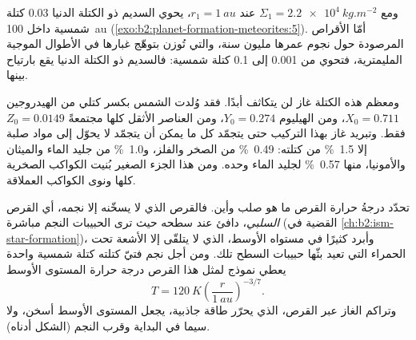 ومع $\Sigma_1 = \qty{2.2e4}{kg.m^{-2}}$ عند $r_1 = \qty{1}{au}$، يحوي السديم ذو الكتلة
الدنيا $0.03$ كتلة شمسية داخل \qty{100}{au} (\cref{exo:b2:planet-formation-meteorites:5}). أمّا الأقراص
المرصودة حول نجوم عمرها مليون سنة، والتي تُوزن بتوهّج غبارها في الأطوال الموجية
المليمترية، فتحوي من 0.001 إلى 0.1 كتلة شمسية: فالسديم ذو الكتلة الدنيا
يقع بارتياح بينها.

ومعظم هذه الكتلة غاز لن يتكاثف أبدًا. فقد وُلدت الشمس
بكسر كتلي من الهيدروجين $X_0 = 0.711$، ومن الهيليوم $Y_0 = 0.274$، ومن
العناصر الأثقل كلها مجتمعةً $Z_0 = 0.0149$ فقط. وتبريد غاز بهذا
التركيب حتى يتجمّد كل ما يمكن أن يتجمّد لا يحوّل إلى مواد صلبة إلا
\qty{1.5}{\percent} من كتلته: \qty{0.49}{\percent} من الصخر
والفلز، و\qty{1.0}{\percent} من جليد الماء والميثان والأمونيا، منها
\qty{0.57}{\percent} لجليد الماء وحده. ومن هذا الجزء الصغير بُنيت الكواكب الصخرية
كلها ونوى الكواكب العملاقة.

تحدّد درجةُ حرارة القرص ما هو صلب وأين. فالقرص الذي لا يسخّنه إلا نجمه، أي
القرص \emph{السلبي}، دافئ عند سطحه حيث ترى الحبيبات
النجم مباشرة (القضية في \cref{ch:b2:ism-star-formation})، وأبرد كثيرًا في
مستواه الأوسط، الذي لا يتلقّى إلا الأشعة تحت الحمراء التي تعيد بثّها
حبيبات السطح تلك. ومن أجل نجم فتيّ كتلته كتلة شمسية واحدة يعطي نموذج لمثل هذا القرص
درجة حرارة المستوى الأوسط
\[
  T = \qty{120}{K}\left(\frac{r}{\qty{1}{au}}\right)^{-3/7}.
\]
وتراكم الغاز عبر القرص، الذي يحرّر طاقة جاذبية، يجعل المستوى الأوسط أسخن،
ولا سيما في البداية وقرب النجم (الشكل أدناه).

